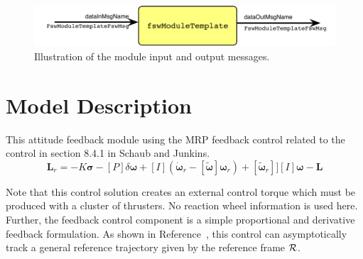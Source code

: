 

\begin{figure}[h]
	\centerline{
		\includegraphics{Figures/moduleImg}
	}
	\caption{Illustration of the module input and output messages.}
	\label{fig:moduleImg}
\end{figure}


\section{Model Description}
This attitude feedback module using the MRP feedback control related to the control in section 8.4.1 in Schaub and Junkins.\cite{schaub}
\begin{equation}
			\label{eq:Lr}
			\bm L_{r} =  -K \bm\sigma - [P] \delta\bm\omega   + [I](\dot{\bm\omega}_{r} - [\tilde{\bm\omega}]\bm\omega_{r}) 
			+[\tilde{\bm \omega}_{r}] ]
			[I]\bm\omega   - \bm L
\end{equation}

Note that this control solution creates an external control torque which must be produced with a cluster of thrusters.  No reaction wheel information is used here.  Further, the feedback control component is a simple proportional and derivative feedback formulation.  As shown in Reference~, this control can asymptotically track a general reference trajectory given by the reference frame $\cal R$.  






